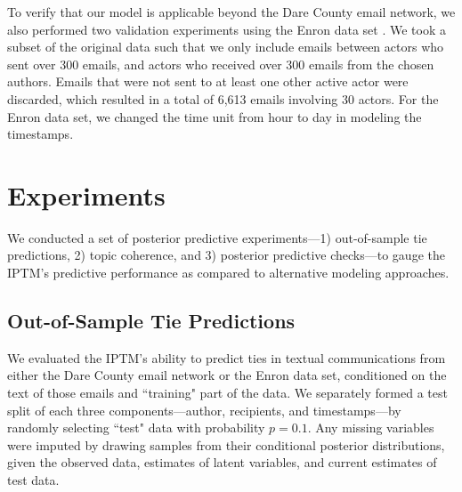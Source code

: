 \documentclass{article}
\begin{document}
To verify that our model is applicable beyond the Dare County email network, we also performed two validation experiments using the Enron data set \cite{klimt2004introducing}. We took a subset of the original data such that we only include emails between actors who sent over 300 emails, and actors who received over 300 emails from the chosen authors. Emails that were not sent to at least one other active actor were discarded, which resulted in a total of 6,613 emails involving 30 actors. For the Enron data set, we changed the time unit from hour to day in modeling the timestamps.

\section{Experiments}\label{sec:Experiments}
We conducted a set of posterior predictive experiments---1) out-of-sample tie predictions, 2) topic coherence, and 3) posterior predictive checks---to gauge the IPTM's predictive performance as compared to alternative modeling approaches.

\subsection{Out-of-Sample Tie Predictions}\label{subsec:Tie Prediction}
We evaluated the IPTM's ability to predict ties in textual communications from either the Dare County email network or the Enron data set, conditioned on the text of those emails and ``training" part of the data. We separately formed a test split of each three components---author, recipients, and timestamps---by randomly selecting ``test" data with probability $p=0.1$. Any missing variables were imputed by drawing samples from their conditional posterior distributions, given the observed data, estimates of latent variables, and current estimates of test data. 
\end{document}
